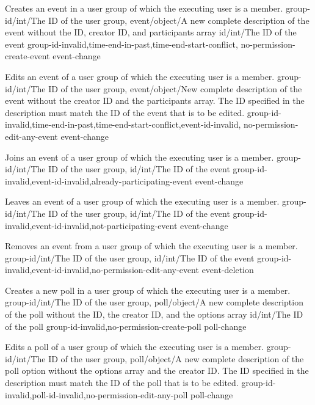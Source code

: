 \documentclass[parskip=full,11pt]{scrartcl}
\begin{document}
{Creates an event in a user group of which the executing user is a member.}
{group-id/int/The ID of the user group,
event/object/A new complete description of the event
without the ID{,} creator ID{,} and participants array}
{id/int/The ID of the event}
{group-id-invalid,time-end-in-past,time-end-start-conflict,
no-permission-create-event}
{event-change}

{Edits an event of a user group of which the executing user is a member.}
{group-id/int/The ID of the user group,
event/object/New complete description of the event without the creator ID and
the participants array.
The ID specified in the description must match the ID of the event that
is to be edited.}
{}
{group-id-invalid,time-end-in-past,time-end-start-conflict,event-id-invalid,
no-permission-edit-any-event}
{event-change}

{Joins an event of a user group of which the executing user is a member.}
{group-id/int/The ID of the user group,
id/int/The ID of the event}
{}
{group-id-invalid,event-id-invalid,already-participating-event}
{event-change}

{Leaves an event of a user group of which the executing user is a member.}
{group-id/int/The ID of the user group,
id/int/The ID of the event}
{}
{group-id-invalid,event-id-invalid,not-participating-event}
{event-change}

{Removes an event from a user group of which the executing user is a member.}
{group-id/int/The ID of the user group,
id/int/The ID of the event}
{}
{group-id-invalid,event-id-invalid,no-permission-edit-any-event}
{event-deletion}

{Creates a new poll in a user group of which the executing user is a member.}
{group-id/int/The ID of the user group,
    poll/object/A new complete description of the poll without the ID{,} the
creator ID{,} and the options array}
{id/int/The ID of the poll}
{group-id-invalid,no-permission-create-poll}
{poll-change}

{Edits a poll of a user group of which the executing user is a member.}
{group-id/int/The ID of the user group,
poll/object/A new complete description of the poll option without
the options array and the creator ID.
The ID specified in the description must match the ID of the poll that
is to be edited.}
{}
{group-id-invalid,poll-id-invalid,no-permission-edit-any-poll}
{poll-change}
\end{document}
